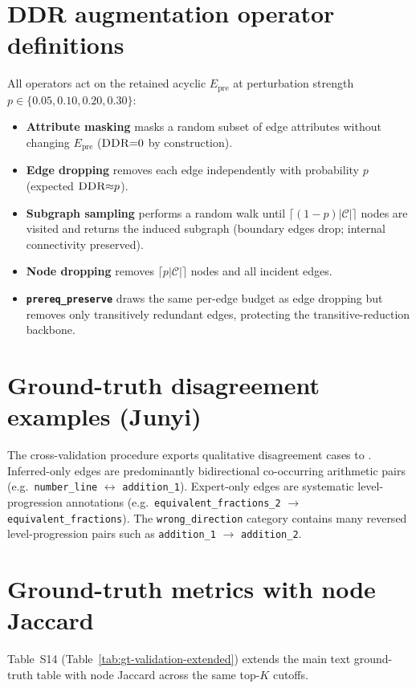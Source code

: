 \documentclass[pdflatex,sn-mathphys-num]{sn-jnl}
\newcommand{\Epre}{\ensuremath{E_{\text{pre}}}}
\newcommand{\DDR}{\textsc{DDR}}
\begin{document}
\section{DDR augmentation operator definitions}
\label{sec:supp-operators}
All operators act on the retained acyclic $\Epre$ at perturbation strength
$p\in\{0.05,0.10,0.20,0.30\}$:
\begin{itemize}
  \item \textbf{Attribute masking} masks a random subset of edge attributes
  without changing $\Epre$ ($\DDR{=}0$ by construction).
  \item \textbf{Edge dropping} removes each edge independently with probability
  $p$ (expected $\DDR{\approx}p$).
  \item \textbf{Subgraph sampling} performs a random walk until
  $\lceil(1-p)|\mathcal{C}|\rceil$ nodes are visited and returns the induced
  subgraph (boundary edges drop; internal connectivity preserved).
  \item \textbf{Node dropping} removes $\lceil p|\mathcal{C}|\rceil$ nodes and
  all incident edges.
  \item \textbf{\texttt{prereq\_preserve}} draws the same per-edge budget as
  edge dropping but removes only transitively redundant edges, protecting the
  transitive-reduction backbone.
\end{itemize}

\section{Ground-truth disagreement examples (Junyi)}
\label{sec:supp-disagreement}
The cross-validation procedure exports qualitative disagreement cases to
. Inferred-only edges are
predominantly bidirectional co-occurring arithmetic pairs (e.g.\
\texttt{number\_line} $\leftrightarrow$ \texttt{addition\_1}). Expert-only
edges are systematic level-progression annotations (e.g.\
\texttt{equivalent\_fractions\_2} $\rightarrow$ \texttt{equivalent\_fractions}).
The \texttt{wrong\_direction} category contains many reversed level-progression
pairs such as \texttt{addition\_1} $\rightarrow$ \texttt{addition\_2}.

\section{Ground-truth metrics with node Jaccard}
\label{sec:supp-gtxv-extended}
Table~S14 (Table~\ref{tab:gt-validation-extended}) extends the main text
ground-truth table with node Jaccard across the same top-$K$ cutoffs.
\end{document}
